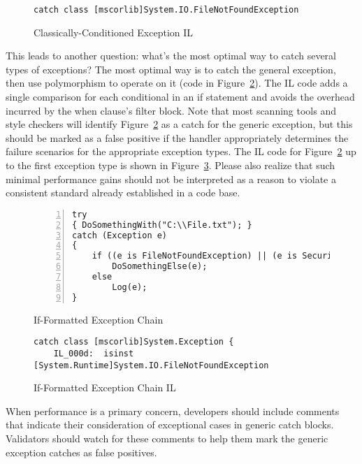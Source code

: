 \begin{figure}[h]
\begin{lstlisting}[style=CSharpStyle]
catch class [mscorlib]System.IO.FileNotFoundException
\end{lstlisting}
\caption{Classically-Conditioned Exception IL}
\label{fig:20170518:exception2il}
\end{figure}

This leads to another question: what's the most optimal way to catch several types of exceptions? The most optimal way is to catch the general exception, then use polymorphism to operate on it (code in Figure~\ref{fig:20170518:exceptionif}). The IL code adds a single comparison for each conditional in an if statement and avoids the overhead incurred by the when clause's filter block. Note that most scanning tools and style checkers will identify Figure~\ref{fig:20170518:exceptionif} as a catch for the generic exception, but this should be marked as a false positive if the handler appropriately determines the failure scenarios for the appropriate exception types. The IL code for Figure~\ref{fig:20170518:exceptionif} up to the first exception type is shown in Figure~\ref{fig:20170518:exceptionifil}. Please also realize that such minimal performance gains should not be interpreted as a reason to violate a consistent standard already established in a code base.

\begin{figure}[h]
\begin{lstlisting}[style=CSharpStyle,numbers=left,stepnumber=1]
try
{ DoSomethingWith("C:\\File.txt"); }
catch (Exception e)
{
	if ((e is FileNotFoundException) || (e is SecurityException))
		DoSomethingElse(e);
	else
		Log(e);
}
\end{lstlisting}
\caption{If-Formatted Exception Chain}
\label{fig:20170518:exceptionif}
\end{figure}

\begin{figure}[h]
\begin{lstlisting}[style=CSharpStyle]
catch class [mscorlib]System.Exception {
	IL_000d:  isinst [System.Runtime]System.IO.FileNotFoundException
\end{lstlisting}
\caption{If-Formatted Exception Chain IL}
\label{fig:20170518:exceptionifil}
\end{figure}

When performance is a primary concern, developers should include comments that indicate their consideration of exceptional cases in generic catch blocks. Validators should watch for these comments to help them mark the generic exception catches as false positives.
